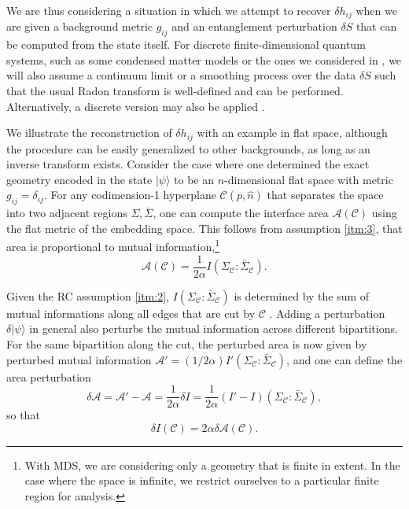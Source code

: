 \documentclass[%
12pt,preprint,
nofootinbib,
amsmath,amssymb,
aps,
prd,
showpacs,
superscriptaddress
]{revtex4-2}
\newcommand{\region}{\Sigma}
\newcommand{\area}{\mathcal{A}}
\DeclareMathOperator{\co}{:}
\begin{document}
We are thus considering a situation in which we attempt to recover $\delta h_{ij}$ when we are given a background metric $g_{ij}$ and an entanglement perturbation $\delta S$ that can be computed from the state itself. 
For discrete finite-dimensional quantum systems, such as some condensed matter models \cite{ising1,ising2, Kitaev97} or the ones we considered in  \cite{Cao:2016mst}, we will also assume a continuum limit or a smoothing process over the data $\delta S$ such that the usual Radon transform is well-defined and can be performed. Alternatively, a discrete version may also be applied  \cite{1165108}. 

We illustrate the reconstruction of $\delta h_{ij}$ with an example in flat space, although the procedure can be easily generalized to other backgrounds, as long as an inverse transform exists. Consider the case where one determined the  exact geometry encoded in the state $|\psi\rangle$ to be an $n$-dimensional flat space with metric $g_{ij}=\delta_{ij}$. For any codimension-1 hyperplane $\mathcal{C}(p,\hat{n})$ that separates the space into two adjacent regions ${\region}, \bar{\region}$, one can compute the interface area $\area(\mathcal{C})$ using the flat metric of the  embedding space. This follows from assumption \ref{itm:3}, that area is proportional to mutual information,\footnote{With MDS, we are considering only a geometry that is finite in extent. In the case where the space is infinite, we restrict ourselves to a particular finite region for analysis. }
\begin{equation}
\area(\mathcal{C})=\frac{1}{2\alpha} I({\region}_{\mathcal{C}}\co \bar{{\region}}_{\mathcal{C}}).
\label{eqn:aptmi}
\end{equation} 

Given the RC assumption \ref{itm:2}, $I({\region}_{\mathcal{C}}\co\bar{{\region}}_{\mathcal{C}})$ is determined by the sum of mutual informations along all edges that are cut by $\mathcal{C}$ \cite{Bao:2015boa}. 
Adding a perturbation $\delta|\psi\rangle$ in general also perturbs the mutual information across different bipartitions. For the same bipartition along the cut, the perturbed area is now given by perturbed mutual information $\area' = (1/2\alpha)I'({\region}_{\mathcal{C}}\co \bar{{\region}}_{\mathcal{C}})$, and one can define the area perturbation 
\begin{equation}
\delta \area =\area'-\area= \frac{1}{2\alpha} \delta I =  \frac{1}{2\alpha} (I'-I)({\region}_{\mathcal{C}}\co\bar{{\region}}_{\mathcal{C}}),
\end{equation}
so that
\begin{equation}
\delta I(\mathcal{C})=2\alpha\delta \area (\mathcal{C}).
\end{equation}
\end{document}
